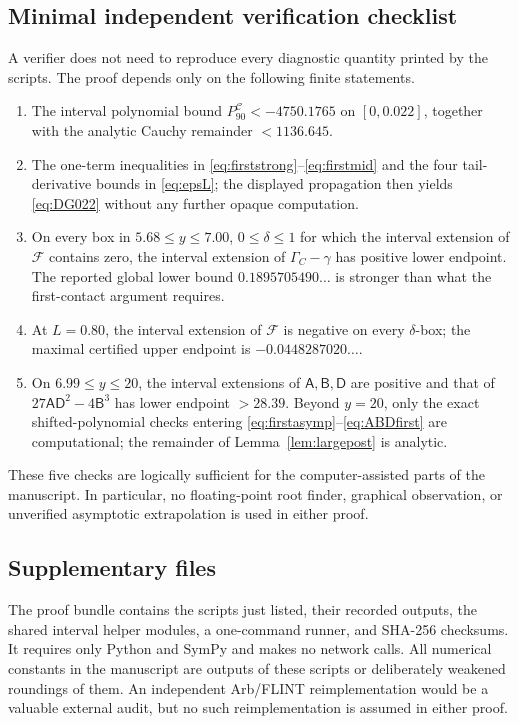 \documentclass{amsart}
\numberwithin{equation}{section}
\theoremstyle{definition}
\theoremstyle{remark}
\newcommand{\Ccal}{\mathcal C}
\newcommand{\Fcal}{\mathcal F}
\begin{document}
\subsection{Minimal independent verification checklist}
A verifier does not need to reproduce every diagnostic quantity printed by the scripts.  The proof depends only on the following finite statements.
\begin{enumerate}
\item The interval polynomial bound $P_{90}^{\Ccal}<-4750.1765$ on $[0,0.022]$, together with the analytic Cauchy remainder $<1136.645$.
\item The one-term inequalities in \eqref{eq:firststrong}--\eqref{eq:firstmid} and the four tail-derivative bounds in \eqref{eq:epsL}; the displayed propagation then yields \eqref{eq:DG022} without any further opaque computation.
\item On every box in $5.68\le y\le7.00$, $0\le\delta\le1$ for which the interval extension of $\Fcal$ contains zero, the interval extension of $\Gamma_C-\gamma$ has positive lower endpoint.  The reported global lower bound $0.1895705490\ldots$ is stronger than what the first-contact argument requires.
\item At $L=0.80$, the interval extension of $\Fcal$ is negative on every $\delta$-box; the maximal certified upper endpoint is $-0.0448287020\ldots$.
\item On $6.99\le y\le20$, the interval extensions of $\mathsf A,\mathsf B,\mathsf D$ are positive and that of $27\mathsf A\mathsf D^2-4\mathsf B^3$ has lower endpoint $>28.39$.  Beyond $y=20$, only the exact shifted-polynomial checks entering \eqref{eq:firstasymp}--\eqref{eq:ABDfirst} are computational; the remainder of Lemma~\ref{lem:largepost} is analytic.
\end{enumerate}
These five checks are logically sufficient for the computer-assisted parts of the manuscript.  In particular, no floating-point root finder, graphical observation, or unverified asymptotic extrapolation is used in either proof.

\subsection{Supplementary files}
The proof bundle contains the scripts just listed, their recorded outputs, the shared interval helper modules, a one-command runner, and SHA-256 checksums.  It requires only Python and SymPy and makes no network calls.  All numerical constants in the manuscript are outputs of these scripts or deliberately weakened roundings of them.  An independent Arb/FLINT reimplementation would be a valuable external audit, but no such reimplementation is assumed in either proof.
\end{document}
